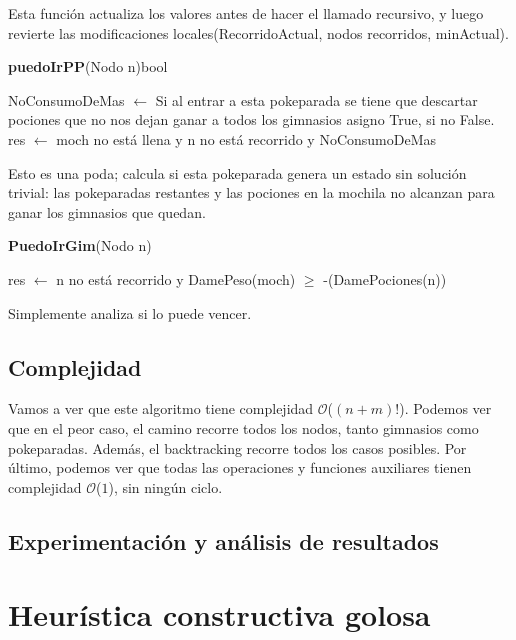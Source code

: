 \documentclass[spanish,12pt]{article}
\begin{document}
Esta función actualiza los valores antes de hacer el llamado recursivo, y luego revierte las modificaciones locales(RecorridoActual, nodos recorridos, minActual).


\begin{algorithm}[H]{\textbf{puedoIrPP}(Nodo n){bool}}
	\begin{algorithmic}[1]
	\State NoConsumoDeMas $\gets$ Si al entrar a esta pokeparada se tiene que descartar pociones que no nos dejan ganar a todos los gimnasios asigno True, si no False.
	\State  res $\gets$  moch no está llena y n no está recorrido y NoConsumoDeMas
	\end{algorithmic}
\end{algorithm}
Esto es una poda; calcula si esta pokeparada genera un estado sin solución trivial: las pokeparadas restantes y las pociones en la mochila no alcanzan para ganar los gimnasios que quedan.

\begin{algorithm}[H]{\textbf{PuedoIrGim}(Nodo n)}
	\begin{algorithmic}[1]
		\state res $\gets$  n no está recorrido y DamePeso(moch) $\geq$ -(DamePociones(n))
	\end{algorithmic}
\end{algorithm}

Simplemente analiza si lo puede vencer.

\subsection{Complejidad}

Vamos a ver que este algoritmo tiene complejidad $\mathcal{O}$($(n+m)!$). Podemos ver que en el peor caso, el camino recorre todos los nodos, tanto gimnasios como pokeparadas. Además, el backtracking recorre todos los casos posibles. Por último, podemos ver que todas las operaciones y funciones auxiliares tienen complejidad $\mathcal{O}$($1$), sin ningún ciclo.

\subsection{Experimentación y análisis de resultados}



\section{Heurística constructiva golosa}
\end{document}
